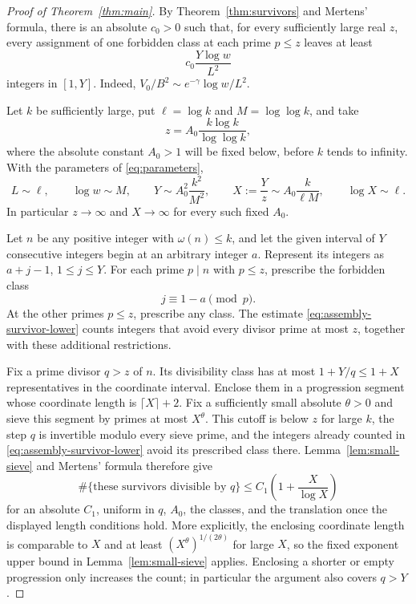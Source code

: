 \begin{proof}[Proof of Theorem~\ref{thm:main}]
By Theorem~\ref{thm:survivors} and Mertens' formula, there is an
absolute $c_0>0$ such that, for every sufficiently large real $z$,
every assignment of one forbidden class at each prime $p\le z$
leaves at least
\begin{equation}\label{eq:assembly-survivor-lower}
 c_0\frac{Y\log w}{L^2}
\end{equation}
integers in $[1,Y]$.  Indeed,
$V_0/B^2\sim e^{-\gamma}\log w/L^2$.

Let $k$ be sufficiently large, put
$\ell=\log k$ and $M=\log\log k$, and take
\begin{equation}\label{eq:assembly-jacobsthal-cutoff}
 z=A_0\frac{k\log k}{\log\log k},
\end{equation}
where the absolute constant $A_0>1$ will be fixed below, before $k$
tends to infinity.  With the parameters of \eqref{eq:parameters},
\begin{equation}\label{eq:assembly-jacobsthal-scales}
 L\sim\ell,\qquad \log w\sim M,\qquad
 Y\sim A_0^2\frac{k^2}{M^2},\qquad
 X:=\frac Yz\sim A_0\frac{k}{\ell M},\qquad
 \log X\sim\ell.
\end{equation}
In particular $z\to\infty$ and $X\to\infty$ for every such fixed
$A_0$.

Let $n$ be any positive integer with $\omega(n)\le k$, and let the
given interval of $Y$ consecutive integers begin at an arbitrary
integer $a$.  Represent its integers as $a+j-1$, $1\le j\le Y$.
For each prime $p\mid n$ with $p\le z$, prescribe the forbidden class
\[
 j\equiv1-a\pmod p.
\]
At the other primes $p\le z$, prescribe any class.  The estimate
\eqref{eq:assembly-survivor-lower} counts integers that avoid every
divisor prime at most $z$, together with these additional restrictions.

Fix a prime divisor $q>z$ of $n$.  Its divisibility class has at most
$1+Y/q\le1+X$ representatives in the coordinate interval.  Enclose
them in a progression segment whose coordinate length is
$\lceil X\rceil+2$.  Fix a sufficiently small absolute $\theta>0$
and sieve this segment by primes at most $X^\theta$.  This cutoff is
below $z$ for large $k$, the step $q$ is invertible modulo every sieve
prime, and the integers already counted in
\eqref{eq:assembly-survivor-lower} avoid its prescribed class there.
Lemma~\ref{lem:small-sieve} and Mertens' formula therefore give
\begin{equation}\label{eq:large-prime-deletion}
 \#\{\text{these survivors divisible by }q\}
 \le C_1\left(1+\frac X{\log X}\right)
\end{equation}
for an absolute $C_1$, uniform in $q$, $A_0$, the classes, and the
translation once the displayed length conditions hold.  More
explicitly, the enclosing coordinate length is comparable to $X$
and at least $(X^\theta)^{1/(2\theta)}$ for large $X$, so the fixed
exponent upper bound in Lemma~\ref{lem:small-sieve} applies.
Enclosing a shorter or empty progression only increases the count;
in particular the argument also covers $q>Y$.


\end{proof}
